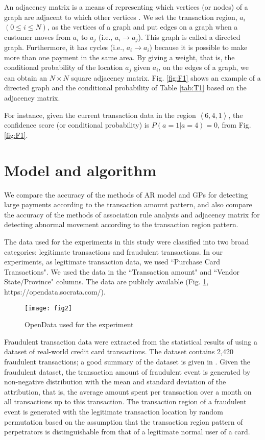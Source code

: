 \documentclass[final,authoryear,5p,times,twocolumn]{elsarticle}
\begin{document}
An adjacency matrix is a means of representing which vertices (or nodes) of a graph are adjacent to which other vertices \citep{wiki:AD}.
We set the transaction region, $a_i$ $(0 \leq i \leq N)$, as the vertices of a graph and put edges on a graph when a customer moves from $a_i$ to $a_j$ (i.e., $a_i \rightarrow a_j$). This graph is called a directed graph. Furthermore, it has cycles (i.e., $a_i \rightarrow a_i$) because it is possible to make more than one payment in the same area. By giving a weight, that is, the conditional probability of the location $a_j$ given $a_i$, on the edges of a graph, we can obtain an $N \times N$ square adjacency matrix. Fig. \ref{fig:F1} shows an example of a directed graph and the conditional probability of Table \ref{tab:T1} based on the adjacency matrix.

For instance, given the current transaction data in the region $\left \langle 6,4,1 \right \rangle$, the confidence score (or conditional probability) is $P(a=1|a=4)=0$, from Fig. \ref{fig:F1}.



\section{Model and algorithm}
\label{section:Sec4}
We compare the accuracy of the methods of AR model \citep{ref18} and GPs \citep{Gaussian06} for detecting large payments according to the transaction amount pattern, and also compare the accuracy of the methods of association rule analysis \citep{ref16} and adjacency matrix \citep{ref19} for detecting abnormal movement according to the transaction region pattern.

The data used for the experiments in this study were classified into two broad categories: legitimate transactions and fraudulent transactions. In our experiments, as legitimate transaction data, we used ``Purchase Card Transactions". We used the data in the ``Transaction amount" and ``Vendor State/Province" columns. The data are publicly available (Fig. \ref{fig:F2}, https://opendata.socrata.com/).

\begin{figure}[h!]
\begin{center}
\texttt{[image: fig2]}
\caption{OpenData used for the experiment}
\label{fig:F2}
\end{center}
\end{figure}

Fraudulent transaction data were extracted from the statistical results of \citet{ref3} using a dataset of real-world credit card transactions. The dataset contains 2,420 fraudulent transactions; a good summary of the dataset is given in \citet[Table 4]{ref3}. Given the fraudulent dataset, the transaction amount of fraudulent event is generated by non-negative distribution with the mean and standard deviation of the attribution, that is, the average amount spent per transaction over a month on all transactions up to this transaction. The transaction region of a fraudulent event is generated with the legitimate transaction location by random permutation based on the assumption that the transaction region pattern of perpetrators is distinguishable from that of a legitimate normal user of a card.
\end{document}
